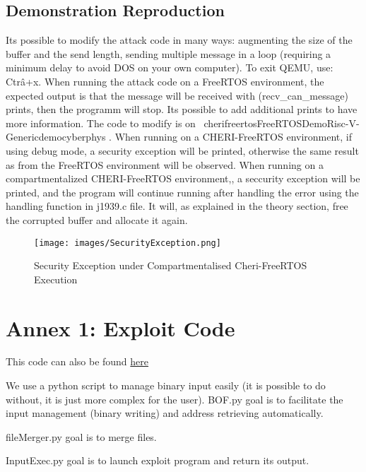 \documentclass[a4paper, 11pt]{article}
\begin{document}
\subsection{Demonstration Reproduction}


Its possible to modify the attack code in many ways: augmenting the size of the buffer and the send length, sending multiple message in a loop (requiring a minimum delay to avoid DOS on your own computer).
To exit QEMU, use: Ctr\^a+x.
When running the attack code on a FreeRTOS environment, the expected output is that the message will be received with (recv\_can\_message) prints, then the programm will stop. Its possible to add additional prints to have more information. The code to modify is on ~\/cheri\/freertos\/FreeRTOS\/Demo\/Risc-V-Generic\/demo\/cyberphys\/ .
When running on a CHERI-FreeRTOS environment, if using debug mode, a security exception will be printed, otherwise the same result as from the FreeRTOS environment will be observed.
When running on a compartmentalized CHERI-FreeRTOS environment,, a seccurity exception will be printed, and the program will continue running after handling the error using the handling function in j1939.c file. It will, as explained in the theory section, free the corrupted buffer and allocate it again.
\begin{figure}[h!]
	\texttt{[image: images/SecurityException.png]}
	\caption{Security Exception under Compartmentalised Cheri-FreeRTOS Execution}
	\label{sec:cyberphys-error}
\end{figure}
\clearpage 



\clearpage 
\appendix
\section{Annex 1: Exploit Code}
This code can also be found \href{https://github.com/pglbgit2/Explanations.git}{here}


We use a python script to manage binary input easily (it is possible to do without, it is just more complex for the user). 
BOF.py goal is to facilitate the input management (binary writing) and address retrieving automatically.

fileMerger.py goal is to merge files.

InputExec.py goal is to launch exploit program and return its output.

\end{document}
